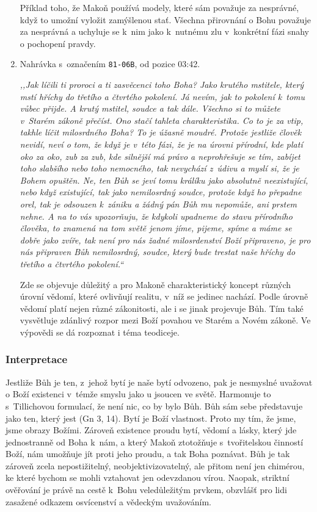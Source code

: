 \begin{enumerate}
{Příklad toho, že Makoň používá modely, které sám považuje za nesprávné, když to
umožní vyložit zamýšlenou stať. Všechna přirovnání o Bohu považuje za nesprávná
a uchyluje se k~nim jako k~nutnému zlu v~konkrétní fázi snahy o pochopení
pravdy.

}

\item{%
Nahrávka s~označením \texttt{81-06B}, od pozice 03:42.

\textit{%
,,Jak líčili ti proroci a ti zasvěcenci toho Boha? Jako krutého mstitele, který
mstí hříchy do třetího a čtvrtého pokolení. Já nevím, jak to pokolení k~tomu
vůbec přijde. A krutý mstitel,
soudce a tak dále. Všechno si to můžete v~Starém zákoně přečíst. Ono stačí tahleta
charakteristika. Co to je za vtip, takhle líčit milosrdného Boha? To je úžasně
moudré.
Protože jestliže člověk nevidí, neví o tom, že když je v~této fázi, že je na úrovni
přírodní, kde platí oko za oko, zub za zub, kde silnější má právo a neprohřešuje
se tím, zabíjet toho slabšího nebo toho nemocného, tak nevychází z~údivu a
myslí si,
že je Bohem opuštěn. Ne, ten Bůh se jeví tomu králíku jako absolutně
neexistující,
nebo když existující, tak jako nemilosrdný soudce, protože když ho přepadne orel,
tak je odsouzen k~zániku a žádný pán Bůh mu nepomůže, ani prstem nehne. A na to
vás upozorňuju, že kdykoli upadneme do stavu přírodního člověka, to znamená na
tom světě jenom jíme, pijeme, spíme a máme se dobře jako zvíře, tak není pro nás
žadné milosrdenství Boží připraveno, je pro nás připraven Bůh nemilosrdný,
soudce, který bude trestat naše hříchy do třetího a čtvrtého pokolení.``
}

Zde se objevuje důležitý a pro Makoně charakteristický koncept různých úrovní
vědomí, které ovlivňují realitu, v~níž se jedinec nachází. Podle úrovně vědomí
platí nejen různé zákonitosti, ale i se jinak projevuje Bůh. Tím také vysvětluje
zdánlivý rozpor mezi Boží povahou ve Starém a Novém zákoně. Ve výpovědi se dá
rozpoznat i téma teodiceje.

}

\end{enumerate}

\subsubsection*{Interpretace}

Jestliže Bůh je ten, z~jehož bytí je naše bytí odvozeno, pak je nesmyslné
uvažovat o Boží existenci v~témže smyslu jako u jsoucen ve světě. Harmonuje to
s~Tillichovou formulací, že není nic, co by bylo Bůh.\cite{tillich1975systematic}
Bůh sám sebe představuje jako ten, který jest (Gn 3, 14). Bytí je Boží vlastnost. Proto my
tím, že jsme, jsme obrazy Božími. Zároveň existence proudu bytí, vědomí a lásky,
který jde jednostranně od Boha k~nám, a který Makoň ztotožňuje s~tvořitelskou
činností Boží, nám umožňuje jít proti jeho proudu, a tak Boha poznávat. Bůh je
tak zároveň zcela nepostižitelný, neobjektivizovatelný, ale přitom není jen
chimérou, ke které bychom se mohli vztahovat jen odevzdanou vírou. Naopak,
striktní ověřování je právě na cestě k~Bohu veledůležitým prvkem, obzvlášť pro
lidi zasažené odkazem osvícenství a vědeckým uvažováním.


